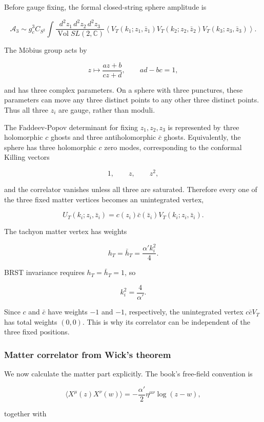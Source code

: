 \documentclass[
  10pt,
  a4paper,
  openany]{book}
\begin{document}
Before gauge fixing, the formal closed-string sphere amplitude is

\[
\mathcal A_3
\sim
g_c^3 C_{S^2}
\int
\frac{d^2z_1\,d^2z_2\,d^2z_3}
{\operatorname{Vol}SL(2,\mathbb C)}
\left\langle
V_T(k_1;z_1,\bar z_1)
V_T(k_2;z_2,\bar z_2)
V_T(k_3;z_3,\bar z_3)
\right\rangle.
\]

The Möbius group acts by

\[
z\longmapsto\frac{az+b}{cz+d},
\qquad
ad-bc=1,
\]

and has three complex parameters. On a sphere with three punctures,
these parameters can move any three distinct points to any other three
distinct points. Thus all three \(z_i\) are gauge, rather than moduli.

The Faddeev-Popov determinant for fixing \(z_1,z_2,z_3\) is represented
by three holomorphic \(c\) ghosts and three antiholomorphic \(\bar c\)
ghosts. Equivalently, the sphere has three holomorphic \(c\) zero modes,
corresponding to the conformal Killing vectors

\[
1,
\qquad
z,
\qquad
z^2,
\]

and the correlator vanishes unless all three are saturated. Therefore
every one of the three fixed matter vertices becomes an unintegrated
vertex,

\[
U_T(k_i;z_i,\bar z_i)
=c(z_i)\bar c(\bar z_i)V_T(k_i;z_i,\bar z_i).
\]

The tachyon matter vertex has weights

\[
h_T=\bar h_T=\frac{\alpha'k_i^2}{4}.
\]

BRST invariance requires \(h_T=\bar h_T=1\), so

\[
k_i^2=\frac4{\alpha'}.
\]

Since \(c\) and \(\bar c\) have weights \(-1\) and \(-1\), respectively,
the unintegrated vertex \(c\bar cV_T\) has total weights \((0,0)\). This
is why its correlator can be independent of the three fixed positions.

\subsubsection{Matter correlator from Wick's
theorem}\label{matter-correlator-from-wicks-theorem}

We now calculate the matter part explicitly. The book's free-field
convention is

\[
\langle X^\mu(z)X^\nu(w)\rangle
=-\frac{\alpha'}2\eta^{\mu\nu}\log(z-w),
\]

together with
\end{document}
